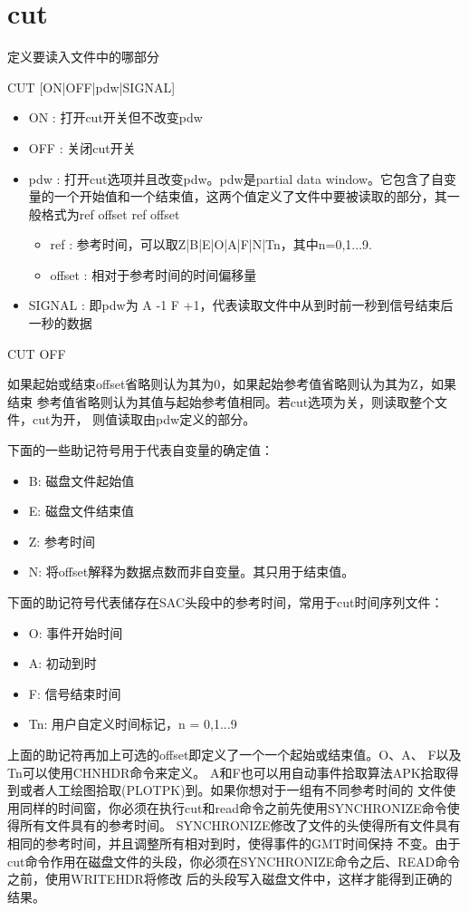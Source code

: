 \section{cut}
\label{cmd:cut}

定义要读入文件中的哪部分

CUT [ON|OFF|pdw|SIGNAL]

\begin{itemize}
\item ON : 打开cut开关但不改变pdw 
\item OFF : 关闭cut开关
\item pdw : 打开cut选项并且改变pdw。pdw是partial data window。它包含了自变量的一个开始值和一个结束值，这两个值定义了文件中要被读取的部分，其一般格式为ref offset ref offset
	\begin{itemize}
	\item ref : 参考时间，可以取Z|B|E|O|A|F|N|Tn，其中n=0,1...9. 
	\item offset : 相对于参考时间的时间偏移量
	\end{itemize}
\item SIGNAL : 即pdw为 A -1 F +1，代表读取文件中从到时前一秒到信号结束后一秒的数据 
\end{itemize}

CUT OFF

如果起始或结束offset省略则认为其为0，如果起始参考值省略则认为其为Z，如果结束
参考值省略则认为其值与起始参考值相同。若cut选项为关，则读取整个文件，cut为开，
则值读取由pdw定义的部分。

下面的一些助记符号用于代表自变量的确定值：
\begin{itemize}
\item B: 磁盘文件起始值
\item E: 磁盘文件结束值
\item Z: 参考时间
\item N: 将offset解释为数据点数而非自变量。其只用于结束值。
\end{itemize}
下面的助记符号代表储存在SAC头段中的参考时间，常用于cut时间序列文件：
\begin{itemize}
\item O: 事件开始时间
\item A: 初动到时
\item F: 信号结束时间
\item Tn: 用户自定义时间标记，n = 0,1...9
\end{itemize}

上面的助记符再加上可选的offset即定义了一个一个起始或结束值。O、A、 F以及Tn可以使用CHNHDR命令来定义。
A和F也可以用自动事件拾取算法APK拾取得到或者人工绘图拾取(PLOTPK)到。如果你想对于一组有不同参考时间的
文件使用同样的时间窗，你必须在执行cut和read命令之前先使用SYNCHRONIZE命令使得所有文件具有的参考时间。
SYNCHRONIZE修改了文件的头使得所有文件具有相同的参考时间，并且调整所有相对到时，使得事件的GMT时间保持
不变。由于cut命令作用在磁盘文件的头段，你必须在SYNCHRONIZE命令之后、READ命令之前，使用WRITEHDR将修改
后的头段写入磁盘文件中，这样才能得到正确的结果。


